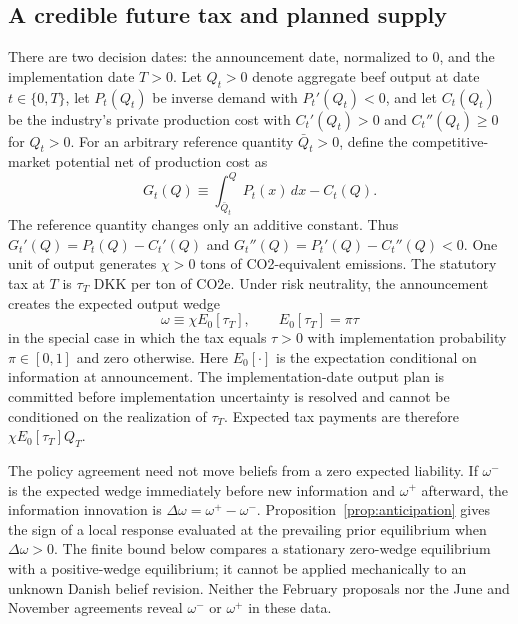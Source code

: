 \documentclass[11pt]{article}
\begin{document}
\subsection{A credible future tax and planned supply}
There are two decision dates: the announcement date, normalized to $0$, and the implementation date $T>0$. Let $Q_t>0$ denote aggregate beef output at date $t\in\{0,T\}$, let $P_t(Q_t)$ be inverse demand with $P_t'(Q_t)<0$, and let $C_t(Q_t)$ be the industry's private production cost with $C_t'(Q_t)>0$ and $C_t''(Q_t)\geq0$ for $Q_t>0$. For an arbitrary reference quantity $\bar Q_t>0$, define the competitive-market potential net of production cost as
\begin{equation}
G_t(Q)\equiv\int_{\bar Q_t}^Q P_t(x)\,dx-C_t(Q).
\end{equation}
The reference quantity changes only an additive constant. Thus $G_t'(Q)=P_t(Q)-C_t'(Q)$ and $G_t''(Q)=P_t'(Q)-C_t''(Q)<0$. One unit of output generates $\chi>0$ tons of CO2-equivalent emissions. The statutory tax at $T$ is $\tau_T$ DKK per ton of CO2e. Under risk neutrality, the announcement creates the expected output wedge
\begin{equation}
\omega\equiv\chi E_0[\tau_T],
\qquad E_0[\tau_T]=\pi\tau
\end{equation}
in the special case in which the tax equals $\tau>0$ with implementation probability $\pi\in[0,1]$ and zero otherwise. Here $E_0[\cdot]$ is the expectation conditional on information at announcement. The implementation-date output plan is committed before implementation uncertainty is resolved and cannot be conditioned on the realization of $\tau_T$. Expected tax payments are therefore $\chi E_0[\tau_T]Q_T$.

The policy agreement need not move beliefs from a zero expected liability. If $\omega^{-}$ is the expected wedge immediately before new information and $\omega^{+}$ afterward, the information innovation is $\Delta\omega=\omega^{+}-\omega^{-}$. Proposition~\ref{prop:anticipation} gives the sign of a local response evaluated at the prevailing prior equilibrium when $\Delta\omega>0$. The finite bound below compares a stationary zero-wedge equilibrium with a positive-wedge equilibrium; it cannot be applied mechanically to an unknown Danish belief revision. Neither the February proposals nor the June and November agreements reveal $\omega^{-}$ or $\omega^{+}$ in these data.
\end{document}

